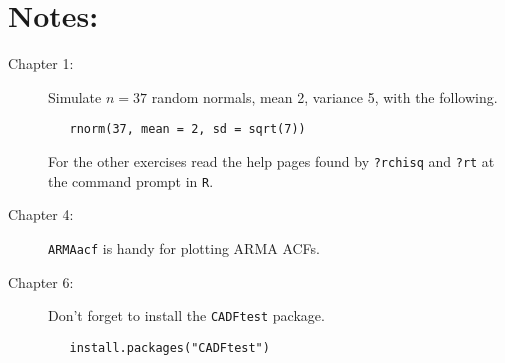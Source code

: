 \documentclass[11pt]{article}
\begin{document}
\vspace{0.25in}

\section*{Notes:}
\label{sec-1}

\begin{description}
\item[Chapter 1:] Simulate $n = 37$ random normals, mean 2, variance 5, with the following.
\begin{verbatim}
   rnorm(37, mean = 2, sd = sqrt(7))
\end{verbatim}
  For the other exercises read the help pages found by \texttt{?rchisq} and \texttt{?rt} at the command prompt in \texttt{R}.
\item[Chapter 4:] \texttt{ARMAacf} is handy for plotting ARMA ACFs.
\item[Chapter 6:] Don't forget to install the \texttt{CADFtest} package.
\begin{verbatim}
   install.packages("CADFtest")
\end{verbatim}
\end{description}
\end{document}
